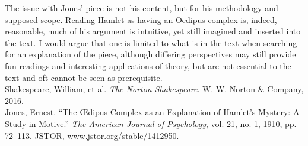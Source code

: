 \documentclass[12pt]{article}
\begin{document}
\indent The issue with Jones' piece is not his content, but for his methodology and supposed scope. Reading Hamlet as having an Oedipus complex is, indeed, reasonable, much of his argument is intuitive, yet still imagined and inserted into the text. I would argue that one is limited to what is in the text when searching for an explanation of the piece, although differing perspectives may still provide fun readings and interesting applications of theory, but are not essential to the text and oft cannot be seen as prerequisite.\\
\newpage
Shakespeare, William, et al. \textit{The Norton Shakespeare}. W. W. Norton \& Company, 2016.\\
Jones, Ernest. ``The Œdipus-Complex as an Explanation of Hamlet's Mystery: A Study in Motive.'' \textit{The American Journal of Psychology}, vol. 21, no. 1, 1910, pp. 72–113. JSTOR, www.jstor.org/stable/1412950.\\
\end{document}
